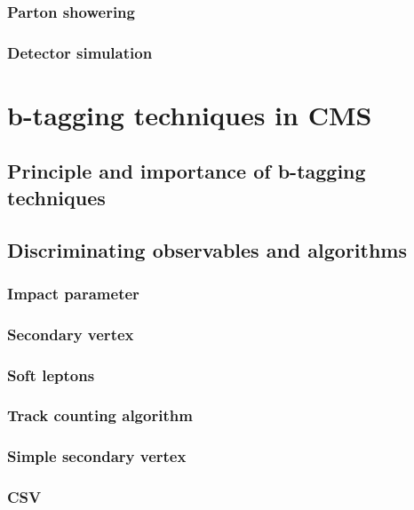         \subsection{Parton showering}
        \loremipsum
        \subsection{Detector simulation}
        \loremipsum

\chapter{b-tagging techniques in CMS}

    \section{Principle and importance of b-tagging techniques}
        \loremipsum

    \section{Discriminating observables and algorithms}
        \loremipsum
        \subsection{Impact parameter}
        \loremipsum
        \subsection{Secondary vertex}
        \loremipsum
        \subsection{Soft leptons}
        \loremipsum
        \subsection{Track counting algorithm}
        \loremipsum
        \subsection{Simple secondary vertex}
        \loremipsum
        \subsection{CSV}
        \loremipsum

